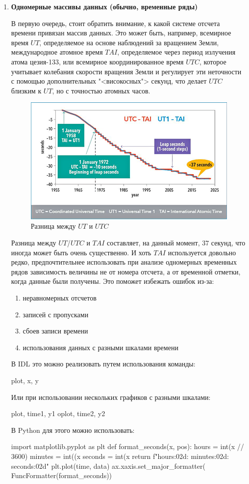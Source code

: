 \begin{enumerate}
	\item \textbf{Одномерные массивы данных (обычно, временные ряды)}

	В первую очередь, стоит обратить внимание, к какой системе отсчета времени привязан массив данных. Это может быть, например, всемирное время $UT$, определяемое на основе наблюдений за вращением Земли, международное атомное время $TAI$, определяемое через период излучения атома цезия-133, или всемирное координированное время $UTC$, которое учитывает колебания скорости вращения Земли и регулирует эти неточности с помощью дополнительных "<високосных"> секунд, что делает $UTC$ близким к $UT$, но с точностью атомных часов.

	\begin{figure}[h!]
		\centering
		\includegraphics[width=0.55\linewidth]{images/grechnev2.png}
		\caption{Разница между $UT$ и $UTC$}
		\label{grechnev2}
	\end{figure}

	Разница между $UT$/$UTC$ и $TAI$ составляет, на данный момент, $37$ секунд, что иногда может быть очень существенно. И хоть $TAI$ используется довольно редко, предпочтительнее использовать при анализе одномерных временных рядов зависимость величины не от номера отсчета, а от временной отметки, когда данные были получены. Это поможет избежать ошибок из-за:
	\begin{enumerate}
		\item неравномерных отсчетов
		\item записей с пропусками
		\item сбоев записи времени
		\item использования данных с разными шкалами времени
	\end{enumerate}
	В IDL это можно реализовать путем использования команды:
	\begin{python}
		plot, x, y
	\end{python}
	Или при использовании нескольких графиков с разными шкалами:
	\begin{python}
		plot, time1, y1
		oplot, time2, y2
	\end{python}
	В Python для этого можно использовать:
	\begin{python}
		import matplotlib.pyplot as plt
		def format_seconds(x, pos):
		hours = int(x // 3600)
		minutes = int((x %
		seconds = int(x %
		return f"{hours:02d}:
		{minutes:02d}:
		{seconds:02d}"
		plt.plot(time, data)
		ax.xaxis.set_major_formatter(
		FuncFormatter(format_seconds))
	\end{python}


\end{enumerate}
